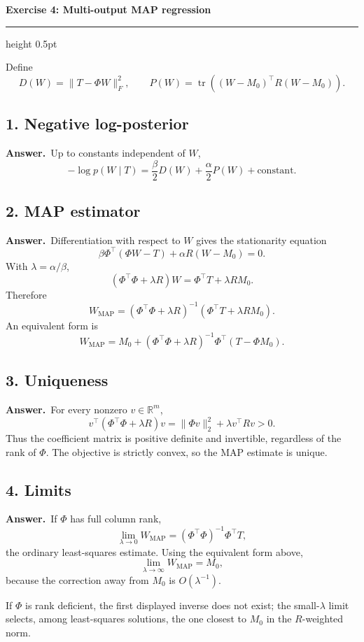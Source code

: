 \documentclass[11pt,a4paper]{article}
\newcommand{\exercise}[2]{%
  \Needspace{8\baselineskip}%
  \par\addvspace{1.1em}%
  {\Large\bfseries\color{examblue}Exercise #1: #2\par}%
  \nobreak\vspace{0.2em}%
  {\color{rulegray}\hrule height 0.5pt}%
  \vspace{0.55em}%
}
\newcommand{\answer}{\textbf{Answer.}\ }
\begin{document}
\exercise{4}{Multi-output MAP regression}

Define
\[
  D(W)=\lVert T-\Phi W\rVert_F^2,
  \qquad
  P(W)=\operatorname{tr}((W-M_0)^\top R(W-M_0)).
\]

\subsection*{1. Negative log-posterior}

\answer Up to constants independent of $W$,
\[
  \boxed{-\log p(W\mid T)
  =\frac{\beta}{2}D(W)+\frac{\alpha}{2}P(W)+\text{constant}}.
\]

\subsection*{2. MAP estimator}

\answer Differentiation with respect to $W$ gives the stationarity equation
\[
  \beta\Phi^\top(\Phi W-T)+\alpha R(W-M_0)=0.
\]
With $\lambda=\alpha/\beta$,
\[
  (\Phi^\top\Phi+\lambda R)W
  =\Phi^\top T+\lambda RM_0.
\]
Therefore
\[
  \boxed{W_{\mathrm{MAP}}
  =(\Phi^\top\Phi+\lambda R)^{-1}
  (\Phi^\top T+\lambda RM_0)}.
\]
An equivalent form is
\[
  W_{\mathrm{MAP}}=M_0+
  (\Phi^\top\Phi+\lambda R)^{-1}
  \Phi^\top(T-\Phi M_0).
\]

\subsection*{3. Uniqueness}

\answer For every nonzero $v\in\mathbb{R}^m$,
\[
  v^\top(\Phi^\top\Phi+\lambda R)v
  =\lVert\Phi v\rVert_2^2+\lambda v^\top Rv>0.
\]
Thus the coefficient matrix is positive definite and invertible, regardless of the rank of $\Phi$. The objective is strictly convex, so the MAP estimate is unique.

\subsection*{4. Limits}

\answer If $\Phi$ has full column rank,
\[
  \boxed{\lim_{\lambda\to0}W_{\mathrm{MAP}}
  =(\Phi^\top\Phi)^{-1}\Phi^\top T},
\]
the ordinary least-squares estimate. Using the equivalent form above,
\[
  \boxed{\lim_{\lambda\to\infty}W_{\mathrm{MAP}}=M_0},
\]
because the correction away from $M_0$ is $O(\lambda^{-1})$.

If $\Phi$ is rank deficient, the first displayed inverse does not exist; the small-$\lambda$ limit selects, among least-squares solutions, the one closest to $M_0$ in the $R$-weighted norm.
\end{document}
